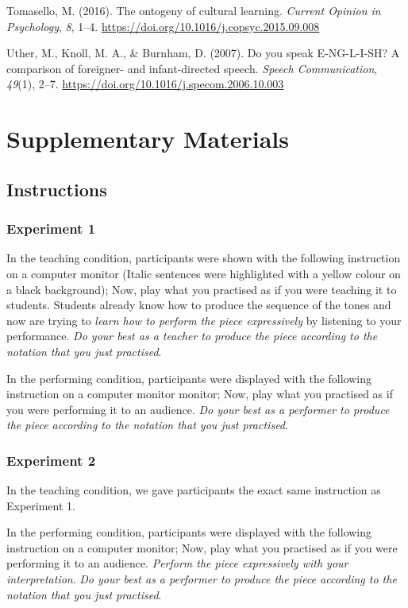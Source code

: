 \documentclass[
  english,
  man,floatsintext]{apa6}
\newlength{\cslhangindent}
\newenvironment{CSLReferences}[2] %
 {%
  \setlength{\parindent}{0pt}
  \ifodd #1 \everypar{\setlength{\hangindent}{\cslhangindent}}\ignorespaces\fi
  \ifnum #2 > 0
  \setlength{\parskip}{#2\baselineskip}
  \fi
 }%
 {}
\begin{document}
\begin{CSLReferences}{1}{0}
\leavevmode{}%
Tomasello, M. (2016). The ontogeny of cultural learning. \emph{Current Opinion in Psychology}, \emph{8}, 1--4. \url{https://doi.org/10.1016/j.copsyc.2015.09.008}

\leavevmode{}%
Uther, M., Knoll, M. A., \& Burnham, D. (2007). Do you speak {E}-{NG}-{L}-{I}-{SH}? {A} comparison of foreigner- and infant-directed speech. \emph{Speech Communication}, \emph{49}(1), 2--7. \url{https://doi.org/10.1016/j.specom.2006.10.003}

\end{CSLReferences}

\endgroup

\clearpage

\hypertarget{supplementary}{%
\section{Supplementary Materials}\label{supplementary}}

\hypertarget{instructions}{%
\subsection{Instructions}\label{instructions}}

\hypertarget{experiment-1-1}{%
\subsubsection{Experiment 1}\label{experiment-1-1}}

In the teaching condition, participants were shown with the following instruction on a computer monitor (Italic sentences were highlighted with a yellow colour on a black background); Now, play what you practised as if you were teaching it to students. Students already know how to produce the sequence of the tones and now are trying to \emph{learn how to perform the piece expressively} by listening to your performance. \emph{Do your best as a teacher to produce the piece according to the notation that you just practised}.

In the performing condition, participants were displayed with the following instruction on a computer monitor monitor; Now, play what you practised as if you were performing it to an audience. \emph{Do your best as a performer to produce the piece according to the notation that you just practised}.

\hypertarget{experiment-2-1}{%
\subsubsection{Experiment 2}\label{experiment-2-1}}

In the teaching condition, we gave participants the exact same instruction as Experiment 1.

In the performing condition, participants were displayed with the following instruction on a computer monitor; Now, play what you practised as if you were performing it to an audience. \emph{Perform the piece expressively with your interpretation}. \emph{Do your best as a performer to produce the piece according to the notation that you just practised}.
\end{document}
